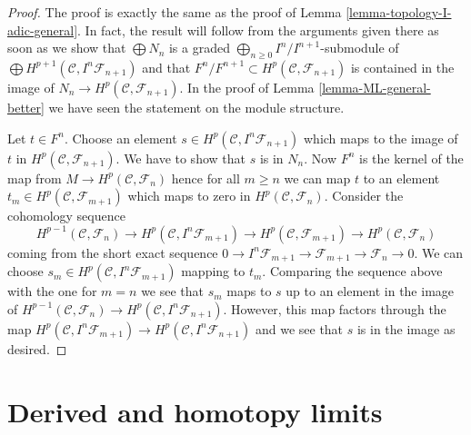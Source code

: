 \begin{proof}
The proof is exactly the same as the proof of
Lemma \ref{lemma-topology-I-adic-general}.
In fact, the result will follow from the arguments given there
as soon as we show that
$\bigoplus N_n$ is a graded $\bigoplus_{n \geq 0} I^n/I^{n + 1}$-submodule
of $\bigoplus H^{p + 1}(\mathcal{C}, I^n\mathcal{F}_{n + 1})$
and that $F^n/F^{n + 1} \subset H^p(\mathcal{C}, \mathcal{F}_{n + 1})$
is contained in the image of $N_n \to H^p(\mathcal{C}, \mathcal{F}_{n + 1})$.
In the proof of Lemma \ref{lemma-ML-general-better}
we have seen the statement on the module structure.

\medskip\noindent
Let $t \in F^n$. Choose an element
$s \in H^p(\mathcal{C}, I^n\mathcal{F}_{n + 1})$
which maps to the image of $t$ in $H^p(\mathcal{C}, \mathcal{F}_{n + 1})$.
We have
to show that $s$ is in $N_n$. Now $F^n$ is the kernel of the map from
$M \to H^p(\mathcal{C}, \mathcal{F}_n)$ hence for all $m \geq n$ we can map $t$
to an element $t_m \in H^p(\mathcal{C}, \mathcal{F}_{m + 1})$ which maps
to zero in $H^p(\mathcal{C}, \mathcal{F}_n)$. Consider the cohomology sequence
$$
H^{p - 1}(\mathcal{C}, \mathcal{F}_n) \to
H^p(\mathcal{C}, I^n\mathcal{F}_{m + 1}) \to
H^p(\mathcal{C}, \mathcal{F}_{m + 1}) \to
H^p(\mathcal{C}, \mathcal{F}_n)
$$
coming from the short exact sequence
$0 \to I^n\mathcal{F}_{m + 1} \to \mathcal{F}_{m + 1} \to \mathcal{F}_n \to 0$.
We can choose $s_m \in H^p(\mathcal{C}, I^n\mathcal{F}_{m + 1})$
mapping to $t_m$.
Comparing the sequence above with the one for $m = n$ we see that
$s_m$ maps to $s$ up to an element in the image of
$H^{p - 1}(\mathcal{C}, \mathcal{F}_n) \to
H^p(\mathcal{C}, I^n\mathcal{F}_{n + 1})$.
However, this map factors through the map
$H^p(\mathcal{C}, I^n\mathcal{F}_{m + 1}) \to
H^p(\mathcal{C}, I^n\mathcal{F}_{n + 1})$
and we see that $s$ is in the image as desired.
\end{proof}












\section{Derived and homotopy limits}
\label{section-derived-limits}

